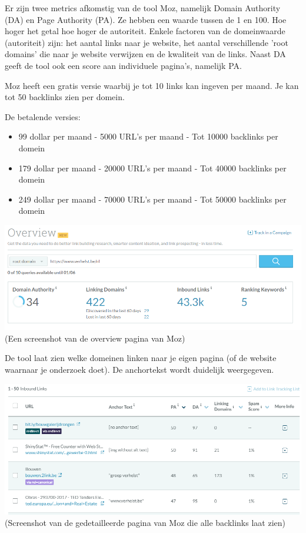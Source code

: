 Er zijn twee metrics afkomstig van de tool Moz, namelijk Domain Authority (DA) en Page Authority (PA). Ze hebben een waarde tussen de 1 en 100. Hoe hoger het getal hoe hoger de autoriteit. Enkele factoren van de domeinwaarde (autoriteit) zijn: het aantal links naar je website, het aantal verschillende 'root domains' die naar je website verwijzen en de kwaliteit van de links. Naast DA geeft de tool ook een score aan individuele pagina's, namelijk PA. 

Moz heeft een gratis versie waarbij je tot 10 links kan ingeven per maand. Je kan tot 50 backlinks zien per domein. 

De betalende versies: 
\begin{itemize}
\item 99 dollar per maand - 5000 URL's per maand - Tot 10000 backlinks per domein
\item 179 dollar per maand - 20000 URL's per maand - Tot 40000 backlinks per domein
\item 249 dollar per maand - 70000 URL's per maand - Tot 50000 backlinks per domein
\end{itemize}

\includegraphics[width=\linewidth]{Bachelorproef/bachelor/img/mozbacklink.PNG}
(Een screenshot van de overview pagina van Moz)

De tool laat zien welke domeinen linken naar je eigen pagina (of de website waarnaar je onderzoek doet). De anchortekst wordt duidelijk weergegeven. 

\includegraphics[width=\linewidth]{Bachelorproef/bachelor/img/mozbacklinks.PNG}
(Screenshot van de gedetailleerde pagina van Moz die alle backlinks laat zien)

